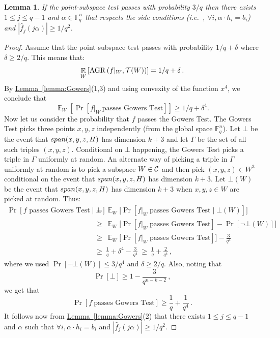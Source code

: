 \documentclass[10pt]{article}
\newtheorem{lemma}[theorem]{Lemma}
\theoremstyle{definition}
\providecommand{\ie}{i.e.\ }
\numberwithin{equation}{section}
\newcommand{\expref}[2]{\texorpdfstring{\hyperref[#2]{#1~\ref{#2}}}{#1~\ref{#2}}}
\newcommand\F{\mathbb{F}}
\DeclareMathOperator*\Exp{\mathbb{E}}
\DeclareMathOperator\AGR{AGR}
\begin{document}
\begin{lemma} \label{lemma:inner} If the point-subspace test passes with probability
${3}/{q}$ then there exists
$1 \leq j \leq q-1$ and $\alpha\in \F_q^n$ that respects the side conditions (\ie, $\forall i,
\alpha \cdot h_i = b_i$) and $| \widehat{f}_j (j \alpha)| \geq {1}/{q^2}$.
\end{lemma}
\begin{proof} Assume that the point-subspace test passes
with probability ${1}/{q}+\delta$ where $\delta \geq {2}/{q}$. This means that:
  $$ \Exp_W \left[ \AGR\left( f|_W,  {\cal T}(W) \right) \right]  = {1}/{q}+\delta\,. $$
By \expref{Lemma}{lemma:Gowers}(1,3) and using convexity of the function $x^4$,
we conclude that
\begin{equation}
\Exp_W \left[\Pr \left[ f|_W \ \mbox{passes Gowers Test} \right] \right] \geq {1}/{q}+\delta^4.
\end{equation}
Now let us consider the probability that $f$ passes the Gowers Test. The Gowers Test
picks three points $x, y, z$ independently (from the global space $\F_q^n$). Let
$\bot$ be the event that  ${\rm span}(x,y,z,H)$ has dimension $k+3$ and
let
$\Gamma$ be the set of all such triples $(x,y,z)$. Conditional on $\bot$ happening,
the Gowers Test picks a triple in $\Gamma$ uniformly at random. An alternate way of
picking a triple in $\Gamma$ uniformly at random is to pick a subspace $W \in {\cal C}$
and then pick $(x,y,z) \in W^3$
conditional on the event that ${\rm span}(x,y,z,H)$ has dimension $k+3$. Let $\bot(W)$
be the event that ${\rm span}(x,y,z,H)$ has dimension $k+3$
when $x,y,z \in W$ are picked at random. Thus:
\begin{align*}
\Pr \left[ \text{$f$ passes Gowers Test} \mid \bot \right]\ &
 =  \ \Exp_W \bigl[ \Pr\left[ f|_W \ \mbox{passes Gowers Test} \mid \bot(W) \right]   \bigr]     \\[1ex]
 & \geq\   \Exp_W \bigl[ \Pr \left[ f|_W \ \mbox{passes Gowers Test}\right] - \Pr[\neg \bot(W)] \bigr] \\
 & \geq\   \Exp_W \bigl[ \Pr \left[ f|_W \ \mbox{passes Gowers Test}\right] \bigr]  - \frac{3}{q^4} \\
 & \geq\   \frac{1}{q} +\delta^4 -\frac{3}{q^4} \ \geq \ \frac{1}{q}+\frac{2}{q^4}\,,
 \end{align*}
where we used $\Pr[ \neg \bot(W)] \leq {3}/{q^4}$ and $\delta \geq {2}/{q}$.
Also, noting that 
\[
\Pr[\bot] \geq 1-\frac{3}{q^{n-k-2}}\,,
\]
we get that
$$\Pr\left[f \ \mbox{passes Gowers Test}\right] \geq \frac{1}{q}+\frac{1}{q^4}\,.$$
It follows now from \expref{Lemma}{lemma:Gowers}(2)
that there exists $1 \leq j \leq q-1$ and $\alpha$ such that $\forall i,
\alpha \cdot h_i = b_i$ and $| \widehat{f}_j (j \alpha)| \geq {1}/{q^2}$.
\end{proof}
\end{document}
